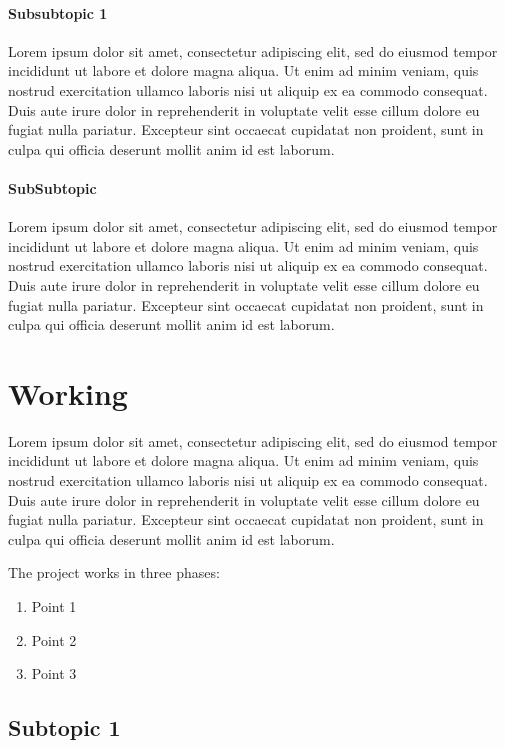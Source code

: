 \documentclass[a4paper,12 pt,oneside]{book}
\begin{document}
\subsubsection{Subsubtopic 1}

Lorem ipsum dolor sit amet, consectetur adipiscing elit, sed do eiusmod tempor incididunt ut labore et dolore magna aliqua. Ut enim ad minim veniam, quis nostrud exercitation ullamco laboris nisi ut aliquip ex ea commodo consequat. Duis aute irure dolor in reprehenderit in voluptate velit esse cillum dolore eu fugiat nulla pariatur. Excepteur sint occaecat cupidatat non proident, sunt in culpa qui officia deserunt mollit anim id est laborum.

\subsubsection{SubSubtopic}

Lorem ipsum dolor sit amet, consectetur adipiscing elit, sed do eiusmod tempor incididunt ut labore et dolore magna aliqua. Ut enim ad minim veniam, quis nostrud exercitation ullamco laboris nisi ut aliquip ex ea commodo consequat. Duis aute irure dolor in reprehenderit in voluptate velit esse cillum dolore eu fugiat nulla pariatur. Excepteur sint occaecat cupidatat non proident, sunt in culpa qui officia deserunt mollit anim id est laborum.

\chapter{Working}

Lorem ipsum dolor sit amet, consectetur adipiscing elit, sed do eiusmod tempor incididunt ut labore et dolore magna aliqua. Ut enim ad minim veniam, quis nostrud exercitation ullamco laboris nisi ut aliquip ex ea commodo consequat. Duis aute irure dolor in reprehenderit in voluptate velit esse cillum dolore eu fugiat nulla pariatur. Excepteur sint occaecat cupidatat non proident, sunt in culpa qui officia deserunt mollit anim id est laborum.

The project works in three phases:
\begin{enumerate}
    \item Point 1
    \item Point 2
    \item Point 3
\end{enumerate}

\section{Subtopic 1 }
\end{document}
